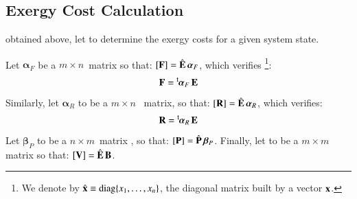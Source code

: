 \documentclass{ecos2018}
\begin{document}
\subsection{Exergy Cost Calculation}
 obtained above, let to determine the exergy costs for a given system state.

Let $\bm{\alpha}_F$ be a $m\times n$~matrix  so that: ${[\mathbf{F}]=\hat{\mathbf{E}}\,\bm{\alpha}_F}$, which verifies
\footnote{We denote by $\hat{\mathbf{x}}\equiv\text{diag}\{x_1,\ldots,x_n\}$, the diagonal matrix built  by a vector $\mathbf{x}$.}:
\begin{equation}
\mathbf{F}=\prescript{\smash{\mathsf{t}}}{}{\mskip-1mu}\bm{\alpha}_F\,\mathbf{E}
\end{equation}
Similarly, let $\bm{\alpha}_R$ to be a  $m\times n$~ matrix, so that: ${\left[ \textbf{R} \right]}=\hat{\mathbf{E}}\,\bm{\alpha}_R$, which verifies: 
\begin{equation}
\mathbf{R} = \prescript{\smash{\mathsf{t}}}{}{\mskip-1mu}\bm{\alpha}_R \, \mathbf{E}
\end{equation}
Let  ${\bm{\beta}_P}$ to be a $ n \times m$~matrix , so that: ${\left[ \textbf{P} \right]=\hat{\mathbf{P}}\,\bm{\beta}_P}$.
Finally, let  to be a  $m \times m$ matrix so that: ${\left[ \textbf{V} \right]=\hat{\mathbf{E}}\,\mathbf{B}}$.
\end{document}
